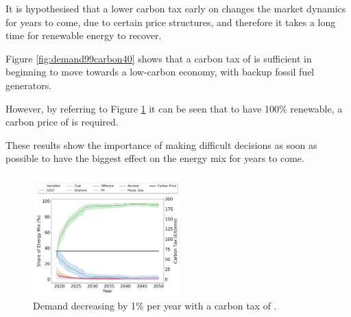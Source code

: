 It is hypothesised that a lower carbon tax early on changes the market dynamics for years to come, due to certain price structures, and therefore it takes a long time for renewable energy to recover.

Figure \ref{fig:demand99carbon40} shows that a carbon tax of  is sufficient in beginning to move towards a low-carbon economy, with backup fossil fuel generators.

However, by referring to Figure \ref{fig:demand99carbon70} it can be seen that to have 100\% renewable, a carbon price of  is required. 

These results show the importance of making difficult decisions as soon as possible to have the biggest effect on the energy mix for years to come.

\begin{figure}
	\begin{center}
		\includegraphics[width=0.5\textwidth]{figures/scenarios/demand099-carbon70-datetime.png}
		\caption{Demand decreasing by 1\% per year with a carbon tax of .}
		\label{fig:demand99carbon70}
	\end{center}
\end{figure}



